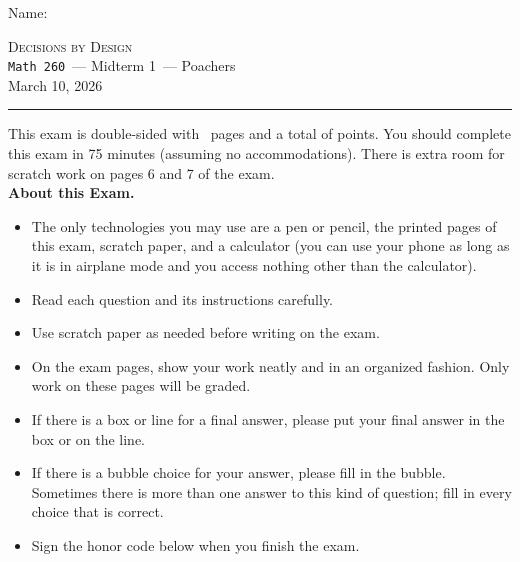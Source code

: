 \documentclass[12pt,addpoints]{exam}
\newcommand{\coursename}{Decisions by Design}
\newcommand{\coursenumber}{{\tt Math 260}}
\newcommand{\examname}{Midterm 1}
\newcommand{\examdate}{March 10, 2026}
\begin{document}
\thispagestyle{empty}
\noindent Name: \hrulefill\\[1em]


\bigskip

\noindent\hrulefill
\bigskip
\begin{center}
\large \textsc{\coursename} \\
\smallskip
\normalsize \coursenumber\ --- \examname\ --- Poachers\\
\smallskip
\examdate
\end{center}
\bigskip
\hrule


\vspace{20pt}

\noindent This exam is double-sided with \numpages\ pages and a total of  points. You should complete this exam in 75 minutes (assuming no accommodations). There is extra room for scratch work on pages 6 and 7 of the exam.\\


\noindent \textbf{About this Exam.}
\begin{itemize}
  \setlength{\itemindent}{-1em}
  \item The only technologies you may use are a pen or pencil, the printed pages of this exam, scratch paper, and a calculator (you can use your phone as long as it is in airplane mode and you access nothing other than the calculator).
	\item Read each question and its instructions carefully.
	\item Use scratch paper as needed before writing on the exam.
	\item On the exam pages, show your work neatly and in an organized fashion. Only work on these pages will be graded.
	\item If there is a box or line for a final answer, please put your final answer in the box or on the line.
	\item If there is a bubble choice for your answer, please fill in the bubble. Sometimes there is more than one answer to this kind of question; fill in every choice that is correct.
  \item Sign the honor code below when you finish the exam.
\end{itemize} 
\end{document}
